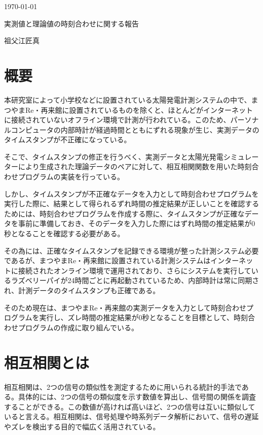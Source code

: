 \documentclass[a4j,12pt,]{jarticle}
\begin{document}
{\noindent\small  \hfill\today}
\begin{center}
  {\Large 実測値と理論値の時刻合わせに関する報告}
\end{center}
\begin{flushright}
  祖父江匠真 \\
\end{flushright}

\section{概要}
本研究室によって小学校などに設置されている太陽発電計測システムの中で、まつやまRe・再来館に設置されているものを除くと、ほとんどがインターネットに接続されていないオフライン環境で計測が行われている。このため、パーソナルコンピュータの内部時計が経過時間とともにずれる現象が生じ、実測データのタイムスタンプが不正確になっている。

そこで、タイムスタンプの修正を行うべく、実測データと太陽光発電シミュレーターにより生成された理論データのペアに対して、相互相関関数を用いた時刻合わせプログラムの実装を行っている。

しかし、タイムスタンプが不正確なデータを入力として時刻合わせプログラムを実行した際に、結果として得られるずれ時間の推定結果が正しいことを確認するためには、時刻合わせプログラムを作成する際に、タイムスタンプが正確なデータを事前に準備しておき、そのデータを入力した際にはずれ時間の推定結果が0秒となることを確認する必要がある。

その為には、正確なタイムスタンプを記録できる環境が整った計測システム必要であるが、まつやまRe・再来館に設置されている計測システムはインターネットに接続されたオンライン環境で運用されており、さらにシステムを実行しているラズベリーパイが24時間ごとに再起動されているため、内部時計は常に同期され、計測データのタイムスタンプも正確である。

そのため現在は、まつやまRe・再来館の実測データを入力として時刻合わせプログラムを実行し、ズレ時間の推定結果が0秒となることを目標として、時刻合わせプログラムの作成に取り組んでいる。

\section{相互相関とは}
相互相関は、2つの信号の類似性を測定するために用いられる統計的手法である。具体的には、2つの信号の類似度を示す数値を算出し、信号間の関係を調査することができる。この数値が高ければ高いほど、2つの信号は互いに類似していると言える。相互相関は、信号処理や時系列データ解析において、信号の遅延やズレを検出する目的で幅広く活用されている。
\end{document}
